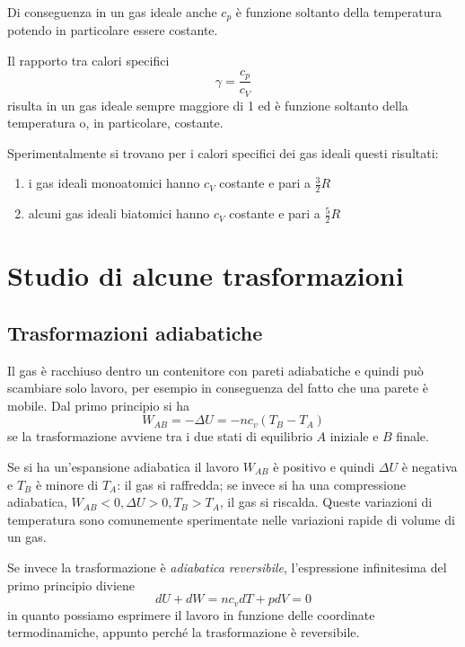 \documentclass[class=book, crop=false, oneside, 12pt]{standalone}
\begin{document}
Di conseguenza in un gas ideale anche \(c_p\) è funzione soltanto della temperatura potendo in particolare essere costante.

Il rapporto tra calori specifici
\begin{equation}
    \gamma = \frac{c_p}{c_V}
\end{equation}
risulta in un gas ideale sempre maggiore di 1 ed è funzione soltanto della temperatura o, in particolare, costante. 

Sperimentalmente si trovano per i calori specifici dei gas ideali questi risultati:
\begin{enumerate}
    \item i gas ideali monoatomici hanno \(c_V\) costante e pari a \(\frac{3}{2} R\)
    \item alcuni gas ideali biatomici hanno \(c_V\) costante e pari a \(\frac{5}{2} R\)
\end{enumerate}

\section{Studio di alcune trasformazioni}

\subsection{Trasformazioni adiabatiche}

Il gas è racchiuso dentro un contenitore con pareti adiabatiche e quindi può scambiare solo lavoro, per esempio in conseguenza del fatto che una parete è mobile. 
Dal primo principio si ha
\begin{equation*}
    W_{AB} = - \Delta U = - n c_v (T_B -T_A)
\end{equation*}
se la trasformazione avviene tra i due stati di equilibrio \(A\) iniziale e \(B\) finale. 

Se si ha un'espansione adiabatica il lavoro \(W_{AB}\) è positivo e quindi \(\Delta U\) è negativa e \(T_B\) è minore di \(T_A\): il gas si raffredda; se invece si ha una compressione adiabatica, \(W_{AB}<0, \Delta U > 0 , T_B > T_A\), il gas si riscalda. 
Queste variazioni di temperatura sono comunemente sperimentate nelle variazioni rapide di volume di un gas.

Se invece la trasformazione è \emph{adiabatica reversibile}, l'espressione infinitesima del primo principio diviene
\begin{equation*}
    d U + d W = n c_v d T + p d V = 0
\end{equation*}
in quanto possiamo esprimere il lavoro in funzione delle coordinate termodinamiche, appunto perché la trasformazione è reversibile.
\end{document}
